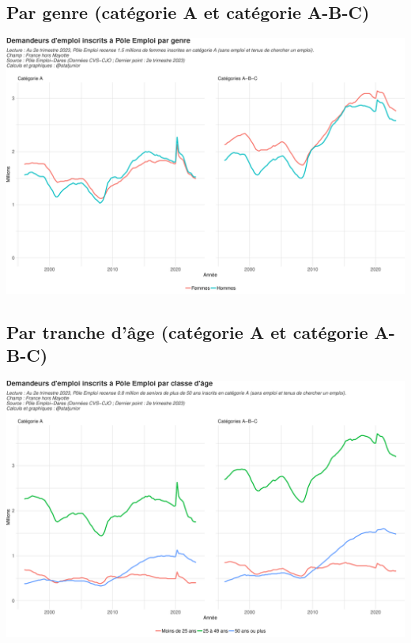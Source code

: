 \documentclass[
  paper=a4,
  ,captions=tableheading
]{scrartcl}
\begin{document}
\hypertarget{par-genre-catuxe9gorie-a-et-catuxe9gorie-a-b-c}{%
\subsection{Par genre (catégorie A et catégorie
A-B-C)}\label{par-genre-catuxe9gorie-a-et-catuxe9gorie-a-b-c}}

\includegraphics{rapport_pdf_demandeurs_emploi_pole_emploi_files/figure-latex/unnamed-chunk-7-1.pdf}

\hypertarget{par-tranche-duxe2ge-catuxe9gorie-a-et-catuxe9gorie-a-b-c}{%
\subsection{Par tranche d'âge (catégorie A et catégorie
A-B-C)}\label{par-tranche-duxe2ge-catuxe9gorie-a-et-catuxe9gorie-a-b-c}}

\includegraphics{rapport_pdf_demandeurs_emploi_pole_emploi_files/figure-latex/unnamed-chunk-9-1.pdf}
\end{document}
